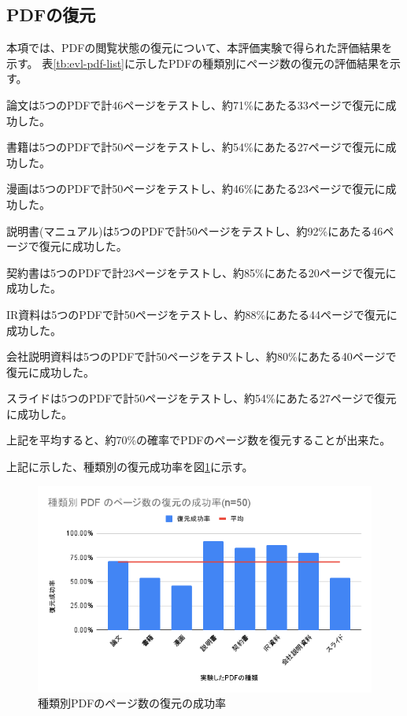 \subsection{PDFの復元}
本項では、PDFの閲覧状態の復元について、本評価実験で得られた評価結果を示す。
表\ref{tb:evl-pdf-list}に示したPDFの種類別にページ数の復元の評価結果を示す。

論文は5つのPDFで計46ページをテストし、約71\%にあたる33ページで復元に成功した。

書籍は5つのPDFで計50ページをテストし、約54\%にあたる27ページで復元に成功した。

漫画は5つのPDFで計50ページをテストし、約46\%にあたる23ページで復元に成功した。

説明書(マニュアル)は5つのPDFで計50ページをテストし、約92\%にあたる46ページで復元に成功した。

契約書は5つのPDFで計23ページをテストし、約85\%にあたる20ページで復元に成功した。

IR資料は5つのPDFで計50ページをテストし、約88\%にあたる44ページで復元に成功した。

会社説明資料は5つのPDFで計50ページをテストし、約80\%にあたる40ページで復元に成功した。

スライドは5つのPDFで計50ページをテストし、約54\%にあたる27ページで復元に成功した。

上記を平均すると、約70\%の確率でPDFのページ数を復元することが出来た。

上記に示した、種類別の復元成功率を図\ref{fig:success-rate-pdf}に示す。


\begin{figure}[htbp]
  \label{fig:success-rate-pdf}
  \begin{center}
    \includegraphics[bb=0 0 600 371,width=15cm]{img/060_evaluation/result/pdf/success-rate-pdf.pdf}
  \end{center}
  \caption{種類別PDFのページ数の復元の成功率}
\end{figure}
